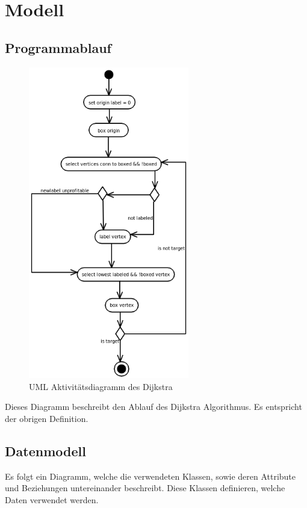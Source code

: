 \documentclass[a4paper,titlepage]{article}
\begin{document}
\section{Modell}

\subsection{Programmablauf}

\begin{figure}
\begin{center}
	\includegraphics[width=7cm]{activity_diagram.png}
\end{center}
\caption{UML Aktivitätsdiagramm des Dijkstra}
\vspace{-60pt}
\end{figure}

Dieses Diagramm beschreibt den Ablauf des Dijkstra Algorithmus. Es entspricht der obrigen Definition.

\clearpage

\subsection{Datenmodell}

Es folgt ein Diagramm, welche die verwendeten Klassen, sowie deren Attribute und Beziehungen untereinander beschreibt. Diese Klassen definieren, welche Daten verwendet werden.
\end{document}
